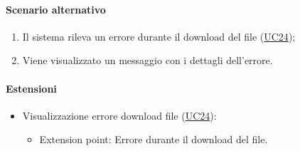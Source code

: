 \paragraph*{Scenario alternativo}
\begin{enumerate}
  \item Il sistema rileva un errore durante il download del file (\hyperref[UC24]{UC24});
  \item Viene visualizzato un messaggio con i dettagli dell'errore.
\end{enumerate}

\paragraph*{Estensioni}
\begin{itemize}
  \item Visualizzazione errore download file (\hyperref[UC24]{UC24}):
  \begin{itemize}
    \item Extension point: Errore durante il download del file.
  \end{itemize}
\end{itemize}